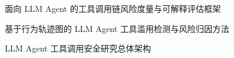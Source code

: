 \documentclass[UTF8,a4paper]{ctexart}
\begin{document}
\begin{figure}[p]
\centering
\resizebox{0.98\linewidth}{!}{}
\caption{面向 LLM Agent 的工具调用链风险度量与可解释评估框架}
\end{figure}
\clearpage

\begin{figure}[p]
\centering
\resizebox{0.98\linewidth}{!}{}
\caption{基于行为轨迹图的 LLM Agent 工具滥用检测与风险归因方法}
\end{figure}
\clearpage

\begin{figure}[p]
\centering
\resizebox{0.98\linewidth}{!}{}
\caption{LLM Agent 工具调用安全研究总体架构}
\end{figure}
\end{document}
